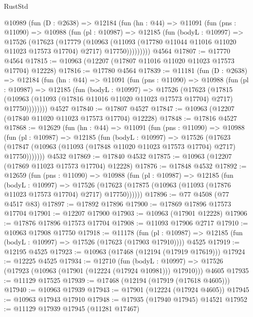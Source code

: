 \begin{lexlean}{RustStd}
\begin{coremodule}
    @10989
      (fun (D : @2638) =>
      @12184
        (fun (hn : @44) =>
        @11091
          (fun (pns : @11090) =>
          @10988
            (fun (pl : @10987) =>
            @12185
              (fun (bodyL : @10997) =>
              @17526
                (@17623
                  (@17779
                    (@10963
                      (@11093 (@17780 @11044 @11016 @11020 @11023 @17573 @17704) @2717)
                      @17750)))))))))
    @4564
@17807 := @17770 @4564
@17815 := @10963 (@12207 (@17807 @11016 @11020 @11023 @17573 @17704) @12228)
@17816 := @17780 @4564
@17839 := @11181
    (fun (D : @2638) =>
    @12184
      (fun (hn : @44) =>
      @11091
        (fun (pns : @11090) =>
        @10988
          (fun (pl : @10987) =>
          @12185
            (fun (bodyL : @10997) =>
            @17526
              (@17623
                (@17815
                  (@10963 (@11093 (@17816 @11016 @11020 @11023 @17573 @17704) @2717) @17750))))))))
    @4527
@17840 := @17807 @4527
@17847 := @10963 (@12207 (@17840 @11020 @11023 @17573 @17704) @12228)
@17848 := @17816 @4527
@17868 := @12629
    (fun (hn : @44) =>
    @11091
      (fun (pns : @11090) =>
      @10988
        (fun (pl : @10987) =>
        @12185
          (fun (bodyL : @10997) =>
          @17526
            (@17623
              (@17847 (@10963 (@11093 (@17848 @11020 @11023 @17573 @17704) @2717) @17750)))))))
    @4532
@17869 := @17840 @4532
@17875 := @10963 (@12207 (@17869 @11023 @17573 @17704) @12228)
@17876 := @17848 @4532
@17892 := @12659
    (fun (pns : @11090) =>
    @10988
      (fun (pl : @10987) =>
      @12185
        (fun (bodyL : @10997) =>
        @17526 (@17623 (@17875 (@10963 (@11093 (@17876 @11023 @17573 @17704) @2717) @17750))))))
@17896 := @77 @4508 (@77 @4517 @83)
@17897 := @17892 @17896
@17900 := @17869 @17896 @17573 @17704
@17901 := @12207 @17900
@17903 := @10963 (@17901 @12228)
@17906 := @17876 @17896 @17573 @17704
@17908 := @11093 @17906 @2717
@17910 := @10963 @17908 @17750
@17918 := @11178
    (fun (pl : @10987) => @12185 (fun (bodyL : @10997) => @17526 (@17623 (@17903 @17910))))
    @4525
@17919 := @12195 @4525
@17923 := @10963 (@17468 (@12194 (@17919 @17619)))
@17924 := @12225 @4525
@17934 := @12710
    (fun (bodyL : @10997) => @17526 (@17923 (@10963 (@17901 (@12224 (@17924 @10981))) @17910)))
    @4605
@17935 := @11129 @17525
@17939 := @17468 (@12194 (@17919 (@17618 @4605)))
@17940 := @10963 @17939
@17943 := @17901 (@12224 (@17924 @4605))
@17945 := @10963 @17943 @17910
@17948 := @17935 (@17940 @17945) @14521
@17952 := @11129 @17939 @17945 (@11281 @17467)

\end{coremodule}
\end{lexlean}
